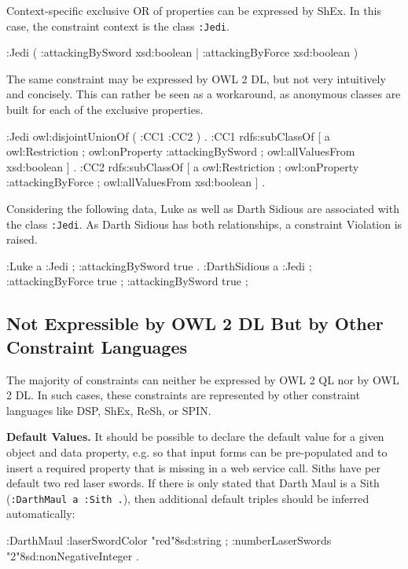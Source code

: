 \documentclass{llncs}
\newcommand{\ms}[1]{\texttt{#1}}
\begin{document}
Context-specific exclusive OR of properties can be expressed by ShEx. 
In this case, the constraint context is the class \ms{:Jedi}.

\begin{ex}
:Jedi { (  
    :attackingBySword xsd:boolean | 
    :attackingByForce xsd:boolean ) }
\end{ex}

The same constraint may be expressed by OWL 2 DL, but not very intuitively and concisely.
This can rather be seen as a workaround, as anonymous classes are built for each of the exclusive properties.

\begin{ex}
:Jedi owl:disjointUnionOf ( :CC1 :CC2 ) . 
:CC1 rdfs:subClassOf [
    a owl:Restriction ;
    owl:onProperty :attackingBySword ;
    owl:allValuesFrom xsd:boolean ] .
:CC2 rdfs:subClassOf [
    a owl:Restriction ;
    owl:onProperty :attackingByForce ;
    owl:allValuesFrom xsd:boolean ] .
\end{ex}

Considering the following data, Luke as well as Darth Sidious are associated with the class \ms{:Jedi}.
As Darth Sidious has both relationships, a constraint Violation is raised.

\begin{ex}
:Luke
    a :Jedi ; 
    :attackingBySword true .
:DarthSidious
    a :Jedi ; 
    :attackingByForce true ;
    :attackingBySword true ;
\end{ex}

\subsection{Not Expressible by OWL 2 DL But by Other Constraint Languages}

The majority of constraints can neither be expressed by OWL 2 QL nor by OWL 2 DL. 
In such cases, these constraints are represented by other constraint languages like DSP, ShEx, ReSh, or SPIN.

\textbf{Default Values.}
It should be possible to declare the default value for a given object and data property, e.g. so that input forms can be pre-populated and to insert a required property that is missing in a web service call. 
Siths have per default two red laser swords.
If there is only stated that Darth Maul is a Sith (\ms{:DarthMaul a :Sith .}), then additional default triples should be inferred automatically: 

\begin{ex}
:DarthMaul 
    :laserSwordColor "red"^^xsd:string ;
    :numberLaserSwords "2"^^xsd:nonNegativeInteger .
\end{ex}
\end{document}
